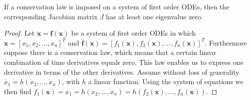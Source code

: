 \begin{theorem}
	\label{th:conservation_implies_zero_eigenvalue}
	If a conservation law is imposed on a system of first order ODEs, then the corresponding Jacobian matrix $J$ has at least one eigenvalue zero.
\end{theorem}
\begin{proof}
	Let $\dot{\bm{x}} = \bm{f}(\bm{x})$ be a system of first order ODEs in which $\bm{x} = [x_1, x_2, ..., x_n]^T$ and $\bm{f(x)} = [f_1(\bm{x}), f_2(\bm{x}), ..., f_n(\bm{x})]^T$. Furthermore suppose there is a conservation law, which means that a certain linear combination of time derivatives equals zero. This law enables us to express one derivative in terms of the other derivatives. Assume without loss of generality  $\dot{x_1}=h(\dot{x}_2,...,\dot{x}_n)$, with $h$ a linear function. Using the system of equations we then find $f_1(\bm{x}) = \dot{x_1}=h(\dot{x}_2,...,\dot{x}_n) = h(f_2(\bm{x}), ..., f_n(\bm{x}))$.
	

\end{proof}
